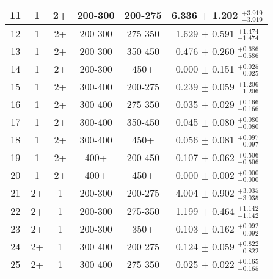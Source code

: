 \begin{table}[htbp]
\begin{centering}
\begin{lrbox}{\closureBox}
\begin{tabular}{|c|c|c|c|c||c|}
 \hline
             11 &               1 &              2+ &         200-300 &         200-275 & 6.336 $\pm$ 1.202 $^{+3.919}_{-3.919}$  \\
 \hline
             12 &               1 &              2+ &         200-300 &         275-350 & 1.629 $\pm$ 0.591 $^{+1.474}_{-1.474}$  \\
 \hline
             13 &               1 &              2+ &         200-300 &         350-450 & 0.476 $\pm$ 0.260 $^{+0.686}_{-0.686}$  \\
 \hline
             14 &               1 &              2+ &         200-300 &            450+ & 0.000 $\pm$ 0.151 $^{+0.025}_{-0.025}$  \\
 \hline
             15 &               1 &              2+ &         300-400 &         200-275 & 0.239 $\pm$ 0.059 $^{+1.206}_{-1.206}$  \\
 \hline
             16 &               1 &              2+ &         300-400 &         275-350 & 0.035 $\pm$ 0.029 $^{+0.166}_{-0.166}$  \\
 \hline
             17 &               1 &              2+ &         300-400 &         350-450 & 0.045 $\pm$ 0.080 $^{+0.080}_{-0.080}$  \\
 \hline
             18 &               1 &              2+ &         300-400 &            450+ & 0.056 $\pm$ 0.081 $^{+0.097}_{-0.097}$  \\
 \hline
             19 &               1 &              2+ &            400+ &         200-450 & 0.107 $\pm$ 0.062 $^{+0.506}_{-0.506}$  \\
 \hline
             20 &               1 &              2+ &            400+ &            450+ & 0.000 $\pm$ 0.002 $^{+0.000}_{-0.000}$  \\
 \hline
             21 &              2+ &               1 &         200-300 &         200-275 & 4.004 $\pm$ 0.902 $^{+3.035}_{-3.035}$  \\
 \hline
             22 &              2+ &               1 &         200-300 &         275-350 & 1.199 $\pm$ 0.464 $^{+1.142}_{-1.142}$  \\
 \hline
             23 &              2+ &               1 &         200-300 &            350+ & 0.103 $\pm$ 0.162 $^{+0.092}_{-0.092}$  \\
 \hline
             24 &              2+ &               1 &         300-400 &         200-275 & 0.124 $\pm$ 0.059 $^{+0.822}_{-0.822}$  \\
 \hline
             25 &              2+ &               1 &         300-400 &         275-350 & 0.025 $\pm$ 0.022 $^{+0.165}_{-0.165}$  \\

\end{tabular}
\end{lrbox}
\end{centering}
\end{table}
